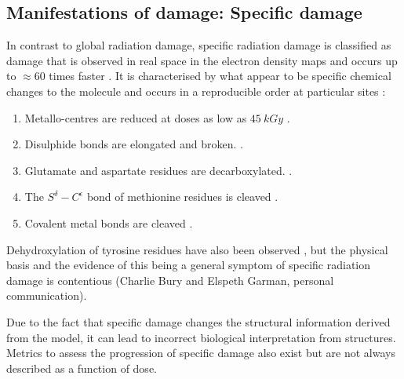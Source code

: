     \subsection{Manifestations of damage: Specific damage}
    \label{sub:Manifestations of damage: Specific damage}
        In contrast to global radiation damage, specific radiation damage is classified as damage that is observed in real space in the electron density maps and occurs up to $\approx 60$ times faster \cite{holton2009}.
        It is characterised by what appear to be specific chemical changes to the molecule and occurs in a reproducible order at particular sites \cite{ravelli2000,weik2000,gerstel2015identifying}:
        \begin{enumerate}
            \item Metallo-centres are reduced at doses as low as $45\ kGy$ \cite{owen2011revealing}.
            \item Disulphide bonds are elongated and broken. \cite{burmeister2000structural,ravelli2000}.
            \item Glutamate and aspartate residues are decarboxylated. \cite{burmeister2000structural,weik2000,ravelli2000}.
            \item The $S^{\delta}-C^{\epsilon}$ bond of methionine residues is cleaved \cite{burmeister2000structural}.
            \item Covalent metal bonds are cleaved \cite{ramagopal2005radiation}.
        \end{enumerate}
        Dehydroxylation of tyrosine residues have also been observed \cite{burmeister2000structural}, but the physical basis and the evidence of this being a general symptom of specific radiation damage is contentious (Charlie Bury and Elspeth Garman, personal communication).

		Due to the fact that specific damage changes the structural information derived from the model, it can lead to incorrect biological interpretation from structures.
		Metrics to assess the progression of specific damage also exist but are not always described as a function of dose.

